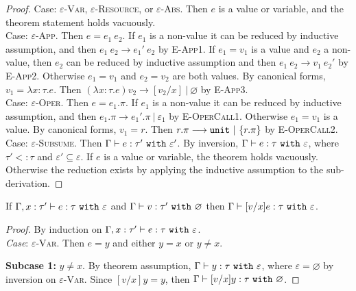 \begin{appendix}
\begin{proof}
Case: \textsc{$\varepsilon$-Var}, \textsc{$\varepsilon$-Resource}, or  \textsc{$\varepsilon$-Abs}. Then $e$ is a value or variable, and the theorem statement holds vacuously.\\

Case: \textsc{$\varepsilon$-App}. Then $ e =  e_1~ e_2$. If $ e_1$ is a non-value it can be reduced by inductive assumption, and then $ e_1~ e_2 \longrightarrow  e_1'~ e_2$ by \textsc{E-App1}. If $ e_1 =  v_1$ is a value and $ e_2$ a non-value, then $e_2$ can be reduced by inductive assumption and then $ e_1~ e_2 \longrightarrow  v_1~ e_2'$ by \textsc{E-App2}. Otherwise $ e_1 = v_1$ and $ e_2 = v_2$ are both values. By canonical forms, $v_1 = \lambda x: \tau. e$. Then $(\lambda x:  \tau.  e)  v_2 \longrightarrow [ v_2/x]~|~\varnothing$ by \textsc{E-App3}.\\

Case: \textsc{$\varepsilon$-Oper}. Then $ e =  e_1.\pi$. If $ e_1$ is a non-value it can be reduced by inductive assumption, and then $ e_1.\pi \longrightarrow  e_1'.\pi~|~\varepsilon_1$ by \textsc{E-OperCall1}. Otherwise $ e_1 =  v_1$ is a value. By canonical forms, $ v_1 = r$. Then $r.\pi \longrightarrow \mathtt{unit}~|~\{ r.\pi \}$ by \textsc{E-OperCall2}.\\

Case: \textsc{$\varepsilon$-Subsume}. Then $ \Gamma \vdash  e:  \tau'~\mathtt{with}~ \varepsilon'$. By inversion, $ \Gamma \vdash  e: \tau~\mathtt{with}~ \varepsilon$, where $\tau' <: \tau$ and $\varepsilon' \subseteq \varepsilon$. If $e$ is a value or variable, the theorem holds vacuously. Otherwise the reduction exists by applying the inductive assumption to the sub-derivation.
\end{proof}

\hrulefill

\begin{lemma}[Substitution]
If $\Gamma, x: \tau' \vdash e: \tau~\mathtt{with}~ \varepsilon$ and $ \Gamma \vdash  v: \tau'~\mathtt{with}~ \varnothing$ then $ \Gamma \vdash [ v/x]e:  \tau~\mathtt{with}~ \varepsilon$.
\end{lemma}

\begin{proof} By induction on $ \Gamma, x:  \tau' \vdash e:  \tau~\mathtt{with}~ \varepsilon$. \\

\textit{Case}: \textsc{$\varepsilon$-Var}. Then $ e = y$ and either $y = x$ or $y \neq x$.

\textbf{Subcase 1:} $y \neq x$. By theorem assumption, $\Gamma \vdash y:\tau~\mathtt{with}~ \varepsilon$, where $\varepsilon = \varnothing$ by inversion on \textsc{$\varepsilon$-Var}. Since $[v/x]y = y$, then $ \Gamma \vdash [ v/x]y:  \tau~\mathtt{with}~ \varnothing$.


\end{proof}
\end{appendix}
